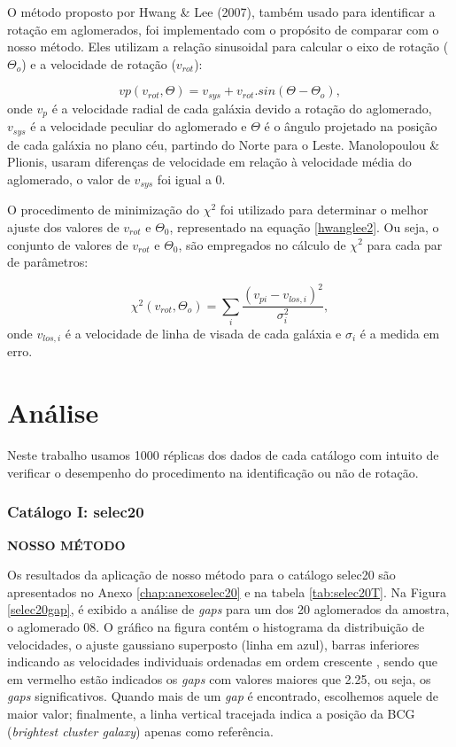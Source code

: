 O método proposto por Hwang \& Lee (2007), também usado para identificar a rotação em aglomerados, foi implementado com o propósito de comparar com o nosso método. Eles utilizam a relação sinusoidal para calcular o eixo de rotação ($\Theta_o$) e a velocidade de rotação ($v_{rot}$):

\begin{equation}
 vp(v_{rot}, \Theta) = v_{sys} + v_{rot} . sin(\Theta - \Theta_o) ,
 \label{eq:hwanglee1}
\end{equation}
onde $v_p$ é a velocidade radial de cada galáxia devido a rotação do aglomerado, $v_{sys}$ é a velocidade peculiar do aglomerado e $\Theta$ é o ângulo projetado na posição de cada galáxia no plano céu, partindo do Norte para o Leste. Manolopoulou \&  Plionis, usaram diferenças de velocidade em relação à velocidade média do aglomerado, o valor de $v_{sys}$ foi igual a 0.

O procedimento de minimização do $\chi^2$ foi utilizado para determinar o melhor ajuste dos valores de $v_{rot}$ e $\Theta_0$, representado na equação \ref{hwanglee2}. Ou seja, o conjunto de valores de $v_{rot}$ e $\Theta_0$, são empregados no cálculo de $\chi^2$ para cada par de parâmetros:

\begin{equation}
 \chi^2 (v_{rot}, \Theta_o) = \sum_i{\frac{(v_{pi} - v_{los, i})^2}{\sigma^{2}_{i}}} ,
 \label{hwanglee2}
\end{equation}
onde $v_{los, i}$ é a velocidade de linha de visada de cada galáxia e $\sigma_i$ é a medida em erro.

\chapter{Análise}


Neste trabalho usamos 1000 réplicas dos dados de cada catálogo com intuito de verificar o desempenho do procedimento na identificação ou não de rotação.  

\subsection{Catálogo I: selec20}
\textbf{NOSSO MÉTODO}

Os resultados da aplicação de nosso método para o catálogo selec20 são apresentados no Anexo \ref{chap:anexoselec20} e na tabela \ref{tab:selec20T}. Na Figura \ref{selec20gap}, é exibido a análise de \textit{gaps} para um dos 20 aglomerados da amostra, o aglomerado 08. O gráfico na figura contém o histograma da distribuição de velocidades, o ajuste gaussiano superposto (linha em azul), barras inferiores indicando as velocidades individuais ordenadas em ordem crescente , sendo que em vermelho estão indicados os \textit{gaps} com valores maiores que 2.25, ou seja, os \textit{gaps} significativos. Quando mais de um \textit{gap} é encontrado, escolhemos aquele de maior valor; finalmente, a linha vertical tracejada indica a posição da BCG (\textit{brightest cluster galaxy}) apenas como referência. 

